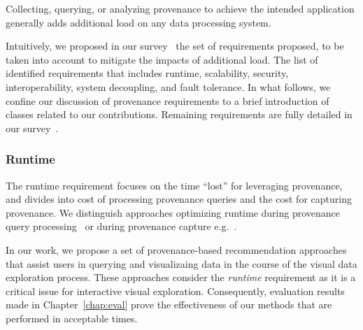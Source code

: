 Collecting, querying, or analyzing provenance to achieve the intended application generally adds additional load on any data processing system. 

Intuitively, we proposed in our survey~\cite{Herschel2017survey} the set of requirements proposed, to be taken into account to mitigate the impacts of additional load.
The list of identified requirements that includes runtime, scalability, security, interoperability, system decoupling, and fault tolerance.
In what follows, we confine our discussion of provenance requirements to a brief introduction of classes related to our contributions. Remaining requirements are fully detailed in our survey~\cite{Herschel2017survey}.




\subsubsection{Runtime}
The runtime requirement focuses on the time ``lost'' for leveraging provenance, and divides into cost of processing provenance queries  and the cost for capturing provenance. 
We distinguish approaches optimizing runtime during provenance query processing~\cite{Karvounarakis2010, Szablocs2011,Anand2010} or during provenance capture e.g.~\cite{Amsterdamer2011,Akoush2013, bidoit:edbt14, bidoit:cikm15}.

In our work, we propose a set of provenance-based recommendation approaches that assist users in querying and visualizaing data in the course of the visual data exploration process. 
These approaches consider the \emph{runtime} requirement as it is a critical issue for interactive visual exploration. Consequently, evaluation results made in Chapter~\ref{chap:eval} prove the effectiveness of our methods that are performed in acceptable times.



